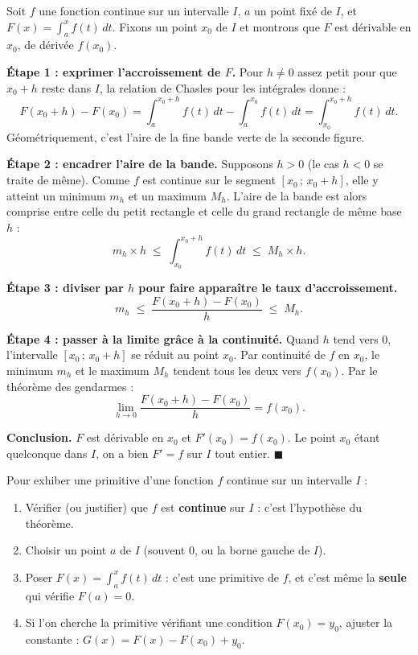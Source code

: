 \documentclass[11pt]{article}
\begin{document}
\begin{experience}
Soit $f$ une fonction continue sur un intervalle $I$, $a$ un point fixé de $I$, et $F(x) = \displaystyle\int_a^x f(t)\,dt$. Fixons un point $x_0$ de $I$ et montrons que $F$ est dérivable en $x_0$, de dérivée $f(x_0)$.

\textbf{Étape 1 : exprimer l'accroissement de $F$.} Pour $h \neq 0$ assez petit pour que $x_0 + h$ reste dans $I$, la relation de Chasles pour les intégrales donne :
\[ F(x_0 + h) - F(x_0) = \int_a^{x_0+h} f(t)\,dt - \int_a^{x_0} f(t)\,dt = \int_{x_0}^{x_0+h} f(t)\,dt. \]
Géométriquement, c'est l'aire de la fine bande verte de la seconde figure.

\textbf{Étape 2 : encadrer l'aire de la bande.} Supposons $h > 0$ (le cas $h < 0$ se traite de même). Comme $f$ est continue sur le segment $[x_0\,;\,x_0+h]$, elle y atteint un minimum $m_h$ et un maximum $M_h$. L'aire de la bande est alors comprise entre celle du petit rectangle et celle du grand rectangle de même base $h$ :
\[ m_h \times h \;\le\; \int_{x_0}^{x_0+h} f(t)\,dt \;\le\; M_h \times h. \]

\textbf{Étape 3 : diviser par $h$ pour faire apparaître le taux d'accroissement.}
\[ m_h \;\le\; \frac{F(x_0+h)-F(x_0)}{h} \;\le\; M_h. \]

\textbf{Étape 4 : passer à la limite grâce à la continuité.} Quand $h$ tend vers $0$, l'intervalle $[x_0\,;\,x_0+h]$ se réduit au point $x_0$. Par continuité de $f$ en $x_0$, le minimum $m_h$ et le maximum $M_h$ tendent tous les deux vers $f(x_0)$. Par le théorème des gendarmes :
\[ \lim_{h \to 0} \frac{F(x_0+h)-F(x_0)}{h} = f(x_0). \]

\textbf{Conclusion.} $F$ est dérivable en $x_0$ et $F'(x_0) = f(x_0)$. Le point $x_0$ étant quelconque dans $I$, on a bien $F' = f$ sur $I$ tout entier. $\blacksquare$
\end{experience}

\begin{methode}
Pour exhiber une primitive d'une fonction $f$ continue sur un intervalle $I$ :
\begin{enumerate}
\item Vérifier (ou justifier) que $f$ est \textbf{continue} sur $I$ : c'est l'hypothèse du théorème.
\item Choisir un point $a$ de $I$ (souvent $0$, ou la borne gauche de $I$).
\item Poser $F(x) = \displaystyle\int_a^x f(t)\,dt$ : c'est une primitive de $f$, et c'est même la \textbf{seule} qui vérifie $F(a) = 0$.
\item Si l'on cherche la primitive vérifiant une condition $F(x_0) = y_0$, ajuster la constante : $G(x) = F(x) - F(x_0) + y_0$.
\end{enumerate}
\end{methode}
\end{document}
